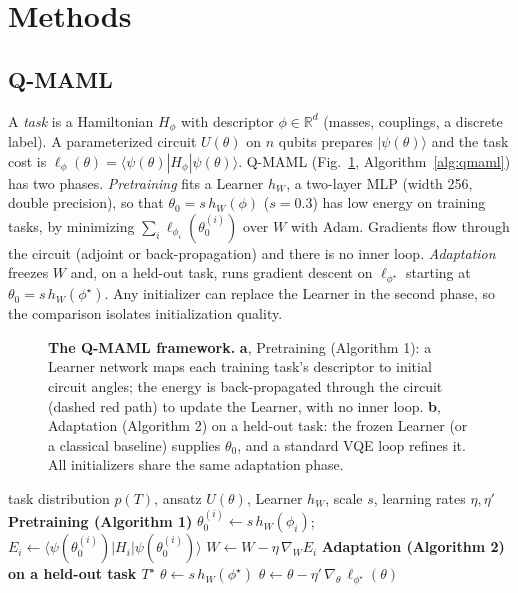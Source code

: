 \section{Methods}\label{sec:methods}

\subsection{Q-MAML}\label{sec:qmaml}

A \emph{task} is a Hamiltonian $H_\phi$ with descriptor $\phi\in\mathbb{R}^d$ (masses, couplings, a discrete label). A parameterized circuit $U(\theta)$ on $n$ qubits prepares $|\psi(\theta)\rangle$ and the task cost is $\ell_\phi(\theta)=\langle\psi(\theta)|H_\phi|\psi(\theta)\rangle$. Q-MAML (Fig.~\ref{fig:framework}, Algorithm~\ref{alg:qmaml}) has two phases. \emph{Pretraining} fits a Learner $h_W$, a two-layer MLP (width 256, double precision), so that $\theta_0=s\,h_W(\phi)$ ($s=0.3$) has low energy on training tasks, by minimizing $\sum_i\ell_{\phi_i}(\theta_0^{(i)})$ over $W$ with Adam. Gradients flow through the circuit (adjoint or back-propagation) and there is no inner loop. \emph{Adaptation} freezes $W$ and, on a held-out task, runs gradient descent on $\ell_{\phi^\star}$ starting at $\theta_0=s\,h_W(\phi^\star)$. Any initializer can replace the Learner in the second phase, so the comparison isolates initialization quality.

\begin{figure}[!htb]
\centering

\caption{\textbf{The Q-MAML framework.} \textbf{a}, Pretraining (Algorithm 1): a Learner network maps each training task's descriptor to initial circuit angles; the energy is back-propagated through the circuit (dashed red path) to update the Learner, with no inner loop. \textbf{b}, Adaptation (Algorithm 2) on a held-out task: the frozen Learner (or a classical baseline) supplies $\theta_0$, and a standard VQE loop refines it. All initializers share the same adaptation phase.}
\label{fig:framework}
\end{figure}

\begin{algorithm}[t]
\caption{Q-MAML pretraining and adaptation}\label{alg:qmaml}
\begin{algorithmic}[1]
\Require task distribution $p(T)$, ansatz $U(\theta)$, Learner $h_W$, scale $s$, learning rates $\eta,\eta'$
\Statex \textbf{Pretraining (Algorithm 1)}
    \State $\theta_0^{(i)}\gets s\,h_W(\phi_i)$; \quad $E_i\gets\langle\psi(\theta_0^{(i)})|H_i|\psi(\theta_0^{(i)})\rangle$
    \State $W\gets W-\eta\,\nabla_W E_i$ 
  \EndFor
\EndFor
\Statex \textbf{Adaptation (Algorithm 2) on a held-out task $T^\star$}
\State $\theta\gets s\,h_{W}(\phi^\star)$
 $\theta\gets\theta-\eta'\,\nabla_\theta\,\ell_{\phi^\star}(\theta)$ \EndFor
\end{algorithmic}
\end{algorithm}


